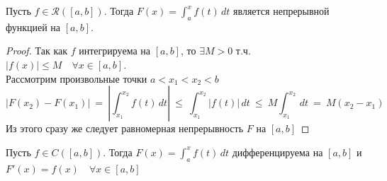 \documentclass[11pt]{article}
\begin{document}
\begin{theorem}
  Пусть $f \in \mathcal{R}([a, b])$. Тогда $F(x) = \displaystyle 
  \int_{a}^{x} f(t)\,dt$ является непрерывной функцией на $[a, b]$.
\end{theorem}

\begin{proof}
  Так как $f$ интегрируема на $[a, b]$, то $\exists M > 0$ т.ч. 
  $\left\lvert f(x) \right\rvert \leq M \quad \forall x \in [a, b]$. \\
  Рассмотрим произвольные точки $a < x_1 < x_2 < b$
  \[\left\lvert F(x_2) - F(x_1) \right\rvert \ = \ \left\lvert 
  \int_{x_1}^{x_2} f(t)\,dt \right\rvert \ \leq \ \int_{x_1}^{x_2} 
  \left\lvert f(t) \right\rvert\,dt \ \leq \ M \int_{x_1}^{x_2} \,dt 
  \ = \ M (x_2 - x_1)\]
  Из этого сразу же следует равномерная непрерывность $F$ на $[a, b]$
\end{proof}

\begin{theorem}
  Пусть $f \in C([a, b])$. Тогда $F(x) = \displaystyle \int_{a}^{x} 
  f(t)\,dt$ дифференцируема на $[a, b]$ и \\
  $F'(x) = f(x) \quad \forall x \in [a, b]$ 
\end{theorem}
\end{document}
